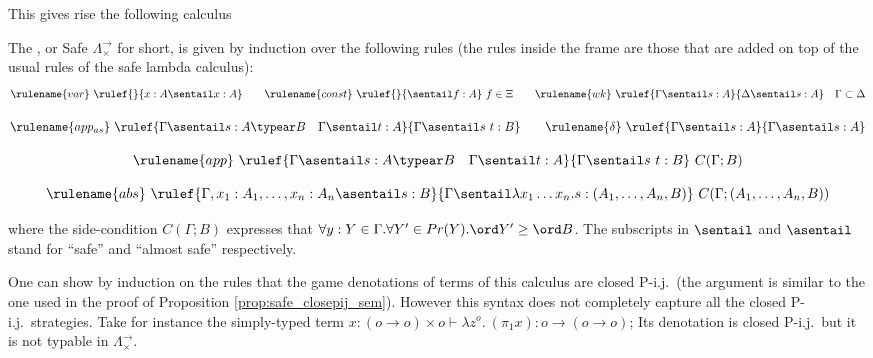 This gives rise the following calculus
\begin{definition}\rm
\label{def:safecalc_withprod}
 The , or Safe $\Lambda^{\rightarrow}_\times$ for short, is given
by induction over the following rules (the rules inside the frame are those that
are added on top of the usual rules of the safe lambda calculus):
$$ \rulename{var} \ \rulef{}{x : A\sentail x : A} \qquad
\rulename{const} \ \rulef{}{\sentail f : A}~f \in \Xi \qquad
\rulename{wk} \ \rulef{\Gamma \sentail s : A}{\Delta \sentail s : A}
\quad \Gamma \subset \Delta$$
\begin{center}
\end{center}

$$ \rulename{app_{as}} \ \rulef{\Gamma \asentail s : A\typear B
\quad \Gamma \sentail t : A} {\Gamma \asentail s~t : B}
\qquad
\rulename{\delta} \ \rulef{\Gamma \sentail s : A}{\Gamma \asentail s : A}
$$

$$ \rulename{app} \ \rulef{\Gamma \asentail s : A\typear B
\quad \Gamma \sentail t : A} {\Gamma \sentail s~t : B} \ C(\Gamma ; B)$$

$$ \rulename{abs} \ \rulef{\Gamma, x_1 : A_1, \ldots, x_n : A_n
  \asentail s : B} {\Gamma \sentail \lambda x_1 \ldots x_n . s :
  (A_1, \ldots ,A_n,B)} \ C(\Gamma ; (A_1, \ldots ,A_n,B) )$$

\noindent where the side-condition $C(\Gamma ; B)$ expresses that
$\forall y:Y \in \Gamma. \forall Y' \in Pr(Y) . \ord Y' \geq \ord
B$. The subscripts in $\sentail$ and $\asentail$ stand for ``safe''
and ``almost safe'' respectively.
\end{definition}

One can show by induction on the rules that the game denotations of
terms of this calculus are closed P-i.j.\ (the argument is similar to
the one used in the proof of Proposition
\ref{prop:safe_closepij_sem}). However this syntax does not
completely capture all the closed P-i.j.\ strategies. Take for
instance the simply-typed term $x:(o\rightarrow o)\times o \vdash \lambda z^o. \
(\pi_1 x) : o \rightarrow (o \rightarrow o)$; Its denotation is
closed P-i.j.\ but it is not typable in
$\Lambda^{\rightarrow}_\times$.


